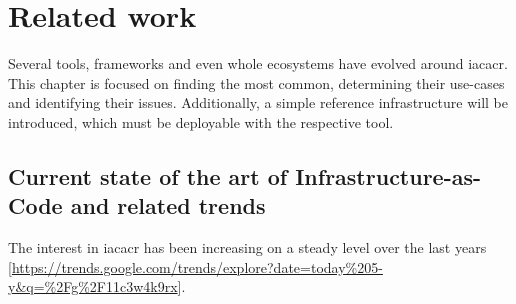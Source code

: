 \chapter{Related work}



Several tools, frameworks and even whole ecosystems have evolved around \gls{iacacr}. This chapter is focused on finding the most common, determining their use-cases and identifying their issues.
Additionally, a simple reference infrastructure will be introduced, which must be deployable with the respective tool.

\section{Current state of the art of Infrastructure-as-Code and related trends} %
The interest in \gls{iacacr} has been increasing on a steady level over the last years [\url{https://trends.google.com/trends/explore?date=today%205-y&q=%2Fg%2F11c3w4k9rx}].
\newline




